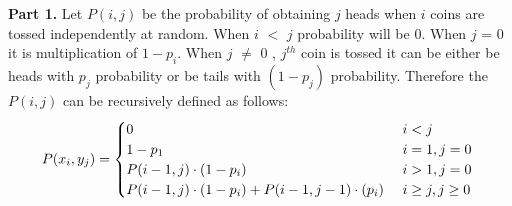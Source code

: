 \documentclass[a4paper,11pt]{article}
\theoremstyle{quest}
\newenvironment{solution}[2][Solution]{\begin{trivlist}
		\item[\hskip \labelsep {\bfseries #1}\hskip \labelsep {\bfseries #2.}]}{\end{trivlist}}
\begin{document}
\begin{solution}3 \textbf{Part 1.} Let $P(i,j)$ be the probability of obtaining $j$ heads when $i$ coins are tossed independently at random. When $i$ $<$ $j$ probability will be 0. When $j$ = 0 it is multiplication of $1-p_i$. When $j$ $\ne$ 0 , $j^{th}$ coin is tossed it can be either be heads with $p_j$ probability or be tails with $(1-p_j)$ probability. Therefore the $P(i,j)$ can be recursively defined as follows:
	\begin{align*}
	P(x_i,y_j) =
	\begin{cases} 
	0    \hfill & \text{ $i<j$ } \\
	1-p_1    \hfill & \text{ $i=1,j=0$ } \\
	P(i-1,j)\cdot(1-p_i)    \hfill & \text{ $i>1,j=0$ } \\
	\hfill P(i-1,j)\cdot(1-p_i)+P(i-1,j-1)\cdot(p_i) \hfill & \text{ $i\ge j,j\ge 0$ }
	\end{cases}
	\end{align*}


\end{solution}
\end{document}
